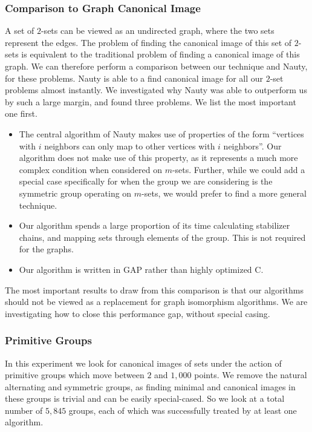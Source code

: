 \subsubsection{Comparison to Graph Canonical Image}

A set of \(2\)-sets can be viewed as an undirected graph, where the two sets represent the edges. The problem of finding the canonical image of this set of \(2\)-sets is equivalent to the traditional problem of finding a canonical image of this graph. We can therefore perform a comparison between our technique and Nauty, for these problems. Nauty is able to a find canonical image for all our \(2\)-set problems almost instantly. We investigated why Nauty was able to outperform us by such a large margin, and found three problems. We list the most important one first.

\begin{itemize}
\item The central algorithm of Nauty makes use of properties of the form ``vertices with \(i\) neighbors can only map to other vertices with \(i\) neighbors''. Our algorithm does not make use of this property, as it represents a much more complex condition when considered on \(m\)-sets. Further, while we could add a special case specifically for when the group we are considering is the symmetric group operating on \(m\)-sets, we would prefer to find a more general technique.
\item Our algorithm spends a large proportion of its time calculating stabilizer chains, and mapping sets through elements of the group. This is not required for the graphs.
\item Our algorithm is written in GAP rather than highly optimized C.
\end{itemize}

The most important results to draw from this comparison is that our algorithms should not be viewed as a replacement for graph isomorphism algorithms. We are investigating how to close this performance gap, without special casing.

\subsubsection{Primitive Groups}

In this experiment we look for canonical images of sets under the action of primitive groups
which move between \(2\) and \(1,000\) points. We remove the natural alternating and
symmetric groups, as finding minimal and canonical images in these groups is
trivial and can be easily special-cased.
So we look at a total number of \(5,845\) groups, each of which was successfully treated by at least one algorithm.

